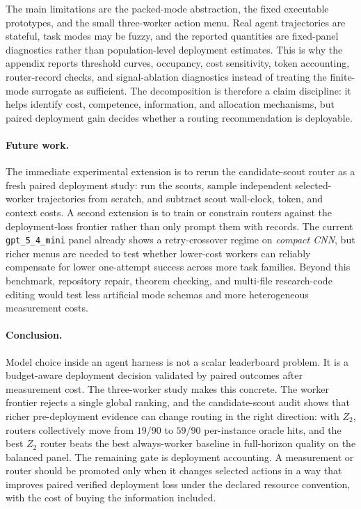 \documentclass{article}
\begin{document}
The main limitations are the packed-mode abstraction, the fixed executable prototypes, and the small three-worker action menu.
Real agent trajectories are stateful, task modes may be fuzzy, and the reported quantities are fixed-panel diagnostics rather than population-level deployment estimates.
This is why the appendix reports threshold curves, occupancy, cost sensitivity, token accounting, router-record checks, and signal-ablation diagnostics instead of treating the finite-mode surrogate as sufficient.
The decomposition is therefore a claim discipline: it helps identify cost, competence, information, and allocation mechanisms, but paired deployment gain decides whether a routing recommendation is deployable.

\paragraph{Future work.}
The immediate experimental extension is to rerun the candidate-scout router as a fresh paired deployment study: run the scouts, sample independent selected-worker trajectories from scratch, and subtract scout wall-clock, token, and context costs.
A second extension is to train or constrain routers against the deployment-loss frontier rather than only prompt them with records.
The current \texttt{gpt\_5\_4\_mini} panel already shows a retry-crossover regime on \textit{compact CNN}, but richer menus are needed to test whether lower-cost workers can reliably compensate for lower one-attempt success across more task families.
Beyond this benchmark, repository repair, theorem checking, and multi-file research-code editing would test less artificial mode schemas and more heterogeneous measurement costs.

\paragraph{Conclusion.}
Model choice inside an agent harness is not a scalar leaderboard problem.
It is a budget-aware deployment decision validated by paired outcomes after measurement cost.
The three-worker study makes this concrete.
The worker frontier rejects a single global ranking, and the candidate-scout audit shows that richer pre-deployment evidence can change routing in the right direction: with \(Z_2\), routers collectively move from \(19/90\) to \(59/90\) per-instance oracle hits, and the best \(Z_2\) router beats the best always-worker baseline in full-horizon quality on the balanced panel.
The remaining gate is deployment accounting.
A measurement or router should be promoted only when it changes selected actions in a way that improves paired verified deployment loss under the declared resource convention, with the cost of buying the information included.
\end{document}
